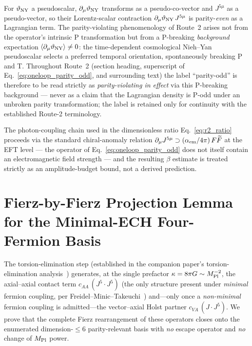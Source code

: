 \documentclass[aps,prd,twocolumn,superscriptaddress,showpacs,preprintnumbers,nofootinbib,longbibliography,floatfix]{revtex4-2}
\begin{document}
For $\vartheta_{\rm NY}$ a pseudoscalar,
$\partial_\mu\vartheta_{\rm NY}$ transforms as a pseudo-co-vector and
$J^{5\mu}$ as a pseudo-vector, so their Lorentz-scalar contraction
$\partial_\mu\vartheta_{\rm NY}\,J^{5\mu}$ is parity-\emph{even} as a
Lagrangian term. The parity-violating phenomenology of Route~2 arises
not from the operator's intrinsic P transformation but from a P-breaking
\emph{background} expectation
$\langle\partial_\mu\vartheta_{\rm NY}\rangle\neq 0$: the time-dependent
cosmological Nieh--Yan pseudoscalar selects a preferred temporal
orientation, spontaneously breaking P and T. Throughout Route~2 (section
heading, superscript of Eq.~\eqref{eq:oneloop_parity_odd}, and
surrounding text) the label ``parity-odd'' is therefore to be read
strictly as \emph{parity-violating in effect} via this P-breaking
background --- never as a claim that the Lagrangian density is P-odd
under an unbroken parity transformation; the label is retained only for
continuity with the established Route-2 terminology.

The photon-coupling chain used in the dimensionless ratio
Eq.~\eqref{eq:r2_ratio} proceeds via the standard chiral-anomaly
relation $\partial_\mu J^{5\mu}\supset(\alpha_{\rm em}/4\pi)\,F\widetilde F$
at the EFT level --- the operator of
Eq.~\eqref{eq:oneloop_parity_odd} does not itself contain an
electromagnetic field strength --- and the resulting $\beta$ estimate is
treated strictly as an amplitude-budget bound, not a derived prediction.

\section{Fierz-by-Fierz Projection Lemma for the Minimal-ECH
Four-Fermion Basis}\label{app:fierz}
The torsion-elimination step (established in the companion paper's
torsion-elimination analysis~\cite{Golden2026P1a}) generates, at the single
prefactor $\kappa=8\pi G\sim M_{\rm Pl}^{-2}$, the axial--axial contact term
$c_{AA}\,(J^5\!\cdot\!J^5)$ (the only structure present under \emph{minimal}
fermion coupling, per Freidel--Minic--Takeuchi~\cite{Freidel2005}) and---only
once a \emph{non-minimal} fermion coupling is admitted---the
vector--axial Holst partner $c_{VA}\,(J\!\cdot\!J^5)$. We prove that the
complete Fierz rearrangement of these operators closes onto the enumerated
dimension-$\le 6$ parity-relevant basis with \emph{no} escape operator and
\emph{no} change of $M_{\rm Pl}$ power.
\end{document}
